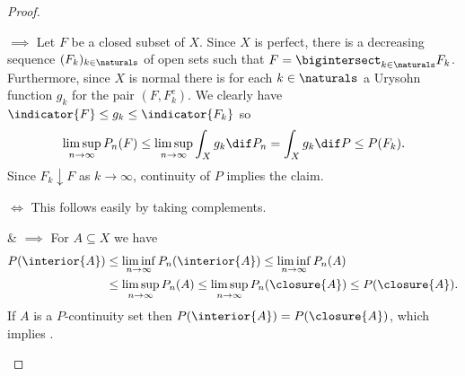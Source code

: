 \documentclass[article, a4paper, 11pt, oneside]{memoir}
\numberwithin{equation}{chapter}
\begin{document}
\begin{proof}
\begin{proofsec}
    \item[\subcref{enum:portmanteau-weak-convergence} $\implies$ \subcref{enum:portmanteau-closed}]
    Let $F$ be a closed subset of $X$. Since $X$ is perfect, there is a decreasing sequence $(F_k)_{k\in\naturals}$ of open sets such that $F = \bigintersect_{k\in\naturals} F_k$. Furthermore, since $X$ is normal there is for each $k \in \naturals$ a Urysohn function $g_k$ for the pair $(F,F_k^c)$. We clearly have $\indicator{F} \leq g_k \leq \indicator{F_k}$ so
    \begin{equation*}
        \limsup_{n\to\infty} P_n(F)
            \leq \limsup_{n\to\infty} \int_X g_k \dif P_n
            = \int_X g_k \dif P
            \leq P(F_k).
    \end{equation*}
    Since $F_k \downarrow F$ as $k \to \infty$, continuity of $P$ implies the claim.

    \item[\subcref{enum:portmanteau-closed} $\Leftrightarrow$ \subcref{enum:portmanteau-open}]
    This follows easily by taking complements.

    \item[\subcref{enum:portmanteau-closed} \& \subcref{enum:portmanteau-open} $\implies$ \subcref{enum:portmanteau-continuity-sets}]
    For $A \subseteq X$ we have
    \begin{align*}
        P(\interior{A})
            &\leq \liminf_{n\to\infty} P_n(\interior{A})
             \leq \liminf_{n\to\infty} P_n(A) \\
            &\leq \limsup_{n\to\infty} P_n(A)
             \leq \limsup_{n\to\infty} P_n(\closure{A})
             \leq P(\closure{A}).
    \end{align*}
    If $A$ is a $P$-continuity set then $P(\interior{A}) = P(\closure{A})$, which implies .


\end{proofsec}
\end{proof}
\end{document}
